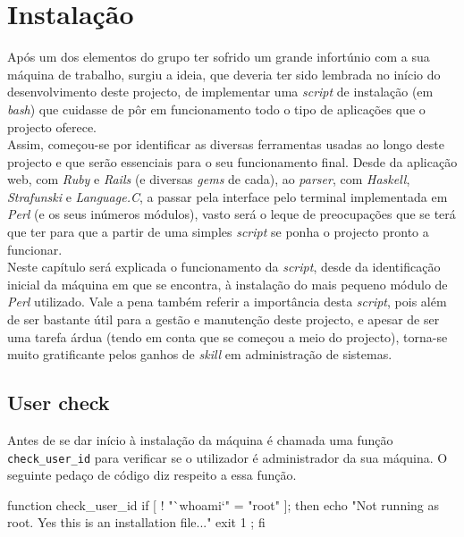 \chapter{Instalação}\label{chap scriptinst}
\minitoc
Após um dos elementos do grupo ter sofrido um grande infortúnio com a sua máquina de trabalho, surgiu a ideia, que deveria ter sido lembrada no início do desenvolvimento deste projecto, 
de implementar uma \emph{script} de instalação (em \emph{bash}) que cuidasse de pôr em funcionamento todo o tipo de aplicações que o projecto oferece.\\

Assim, começou-se por identificar as diversas ferramentas usadas ao longo deste projecto e que serão essenciais para o seu funcionamento final. Desde da aplicação web, com \emph{Ruby} e 
\emph{Rails} (e diversas \emph{gems} de cada), ao \emph{parser}, com \emph{Haskell}, \emph{Strafunski} e \emph{Language.C}, a passar pela interface pelo terminal implementada em 
\emph{Perl} (e os seus inúmeros módulos), vasto será o leque de preocupações que se terá que ter para que a partir de uma simples \emph{script} se ponha o projecto pronto a funcionar.\\

Neste capítulo será explicada o funcionamento da \emph{script}, desde da identificação inicial da máquina em que se encontra, à instalação do mais pequeno módulo de \emph{Perl} utilizado.
Vale a pena também referir a importância desta \emph{script}, pois além de ser bastante útil para a gestão e manutenção deste projecto, e apesar de ser uma tarefa árdua (tendo em conta 
que se começou a meio do projecto), torna-se muito gratificante pelos ganhos de \emph{skill} em administração de sistemas.\\

\section{User check}
Antes de se dar início à instalação da máquina é chamada uma função \texttt{check\_user\_id} para verificar se o utilizador é administrador da sua máquina. O seguinte pedaço de código 
diz respeito a essa função.

\begin{myxml}
 function check_user_id {
        if [ ! "`whoami`" = "root" ]; then
                echo "Not running as root. Yes this is an installation file..."
                exit 1 ;
        fi
}
\end{myxml}


